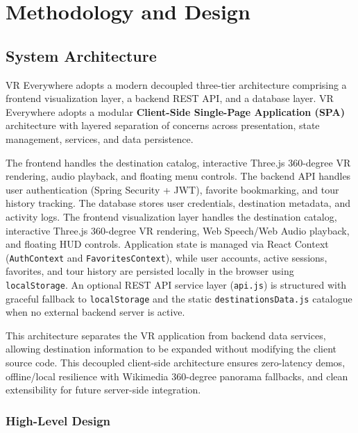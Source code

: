 \documentclass{tietreport}
\begin{document}

\chapter{Methodology and Design}

\section{System Architecture}

VR Everywhere adopts a modern decoupled three-tier architecture comprising a frontend visualization layer, a backend REST API, and a database layer.
VR Everywhere adopts a modular \textbf{Client-Side Single-Page Application (SPA)} architecture with layered separation of concerns across presentation, state management, services, and data persistence.

The frontend handles the destination catalog, interactive Three.js 360-degree VR rendering, audio playback, and floating menu controls. The backend API handles user authentication (Spring Security + JWT), favorite bookmarking, and tour history tracking. The database stores user credentials, destination metadata, and activity logs.
The frontend visualization layer handles the destination catalog, interactive Three.js 360-degree VR rendering, Web Speech/Web Audio playback, and floating HUD controls. Application state is managed via React Context (\texttt{AuthContext} and \texttt{FavoritesContext}), while user accounts, active sessions, favorites, and tour history are persisted locally in the browser using \texttt{localStorage}. An optional REST API service layer (\texttt{api.js}) is structured with graceful fallback to \texttt{localStorage} and the static \texttt{destinationsData.js} catalogue when no external backend server is active.

This architecture separates the VR application from backend data services, allowing destination information to be expanded without modifying the client source code.
This decoupled client-side architecture ensures zero-latency demos, offline/local resilience with Wikimedia 360-degree panorama fallbacks, and clean extensibility for future server-side integration.

\subsection{High-Level Design}
\end{document}
